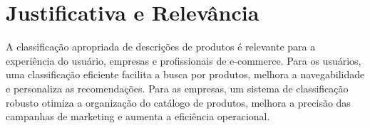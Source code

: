 

\section{Justificativa e Relevância}

A classificação apropriada de descrições de produtos é relevante para a experiência do usuário, empresas e profissionais de e-commerce. Para os usuários, uma classificação eficiente facilita a busca por produtos, melhora a navegabilidade e personaliza as recomendações. Para as empresas, um sistema de classificação robusto otimiza a organização do catálogo de produtos, melhora a precisão das campanhas de marketing e aumenta a eficiência operacional.








